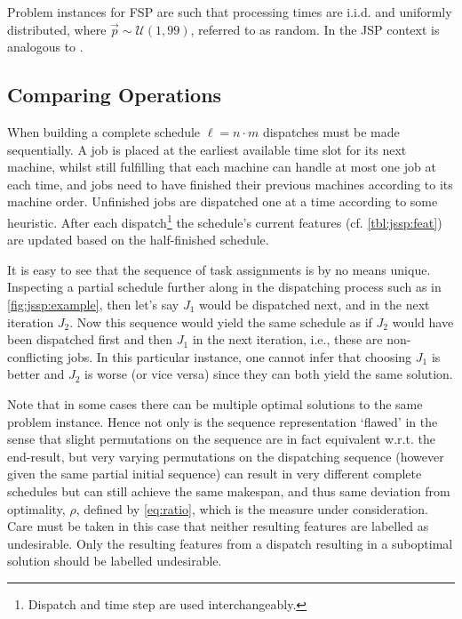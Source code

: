 \documentclass[smallextended]{svjour3}
\begin{document}
Problem instances for FSP are such that processing times are i.i.d. and 
uniformly distributed,   where $\vec{p}\sim\mathcal{U}(1,99)$, 
referred to as random. In the JSP context   is analogous to 
. 

\begin{table}\centering
  \caption[Problem space distributions used in experimental studies.]{Problem 
    space distributions used in experimental studies. Note, problem instances 
    are synthetic and each problem space is i.i.d. 
  }\label{tbl:data:sim}
  
\end{table} 


\subsection{Comparing Operations}\label{sec:compare}
When building a complete schedule $\ell=n\cdot m$ dispatches must be made 
sequentially.  A job is placed at the earliest available time slot for its next 
machine, whilst still fulfilling that each machine can handle at most one job 
at each time, and jobs need to have finished their previous machines according 
to its machine order. Unfinished jobs are dispatched one at a time according to 
some heuristic. After each dispatch\footnote{Dispatch and time step are used 
	interchangeably.} the schedule's current features (cf. 
	\cref{tbl:jssp:feat}) 
are updated based on the half-finished schedule.

It is easy to see that the sequence of task assignments is by no means unique. 
Inspecting a partial schedule further along in the dispatching process such as 
in \cref{fig:jssp:example}, then let's say $J_1$ would be dispatched next, and 
in the next iteration $J_2$. Now this sequence would yield the same schedule as 
if $J_2$ would have been dispatched first and then $J_1$ in the next iteration, 
i.e., these are non-conflicting jobs.  In this particular instance, one cannot 
infer that choosing $J_1$ is better and $J_2$ is worse (or vice versa) since
they can both yield the same solution. 

Note that in some cases there can be multiple optimal solutions to the same 
problem instance. Hence not only is the sequence representation `flawed' in the 
sense that slight permutations on the sequence are in fact equivalent w.r.t. 
the end-result, but very varying permutations on the dispatching sequence 
(however given the same partial initial sequence) can result in very different 
complete schedules but can still achieve the same makespan, and thus same 
deviation from optimality, $\rho$, defined by \cref{eq:ratio}, which is the 
measure under consideration. Care must be taken in this case that neither 
resulting features are labelled as undesirable. Only the resulting features 
from a dispatch resulting in a suboptimal solution should be labelled 
undesirable.
\end{document}
